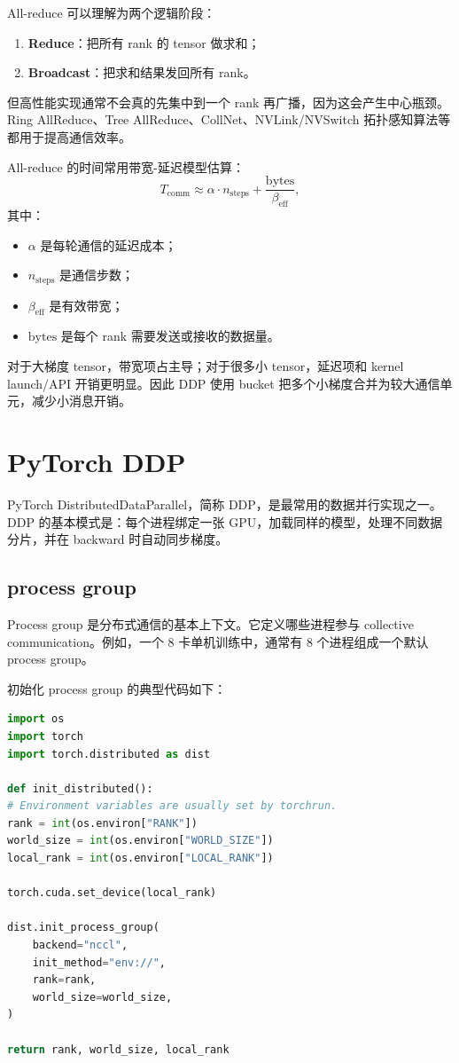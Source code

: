 All-reduce 可以理解为两个逻辑阶段：

\begin{enumerate}
\item \textbf{Reduce}：把所有 rank 的 tensor 做求和；
\item \textbf{Broadcast}：把求和结果发回所有 rank。
\end{enumerate}

但高性能实现通常不会真的先集中到一个 rank 再广播，因为这会产生中心瓶颈。Ring AllReduce、Tree AllReduce、CollNet、NVLink/NVSwitch 拓扑感知算法等都用于提高通信效率。

All-reduce 的时间常用带宽-延迟模型估算：
\[
T_{\mathrm{comm}}
\approx
\alpha\cdot n_{\mathrm{steps}}
+
\frac{\mathrm{bytes}}{\beta_{\mathrm{eff}}},
\]
其中：

\begin{itemize}
\item $\alpha$ 是每轮通信的延迟成本；
\item $n_{\mathrm{steps}}$ 是通信步数；
\item $\beta_{\mathrm{eff}}$ 是有效带宽；
\item $\mathrm{bytes}$ 是每个 rank 需要发送或接收的数据量。
\end{itemize}

对于大梯度 tensor，带宽项占主导；对于很多小 tensor，延迟项和 kernel launch/API 开销更明显。因此 DDP 使用 bucket 把多个小梯度合并为较大通信单元，减少小消息开销。

\section{PyTorch DDP}
\label{sec:pytorch-ddp}

PyTorch DistributedDataParallel，简称 DDP，是最常用的数据并行实现之一。DDP 的基本模式是：每个进程绑定一张 GPU，加载同样的模型，处理不同数据分片，并在 backward 时自动同步梯度。

\subsection{process group}
\label{subsec:process-group}

Process group 是分布式通信的基本上下文。它定义哪些进程参与 collective communication。例如，一个 8 卡单机训练中，通常有 8 个进程组成一个默认 process group。

初始化 process group 的典型代码如下：

\begin{lstlisting}[language=Python,caption={初始化 PyTorch Process Group},label={lst:init-process-group}]
import os
import torch
import torch.distributed as dist

def init_distributed():
# Environment variables are usually set by torchrun.
rank = int(os.environ["RANK"])
world_size = int(os.environ["WORLD_SIZE"])
local_rank = int(os.environ["LOCAL_RANK"])

torch.cuda.set_device(local_rank)

dist.init_process_group(
    backend="nccl",
    init_method="env://",
    rank=rank,
    world_size=world_size,
)

return rank, world_size, local_rank

\end{lstlisting}

